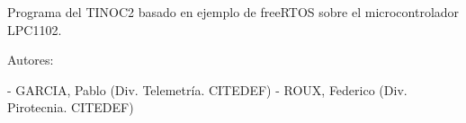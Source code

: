 Programa del T\+I\+N\+O\+C2 basado en ejemplo de free\+R\+T\+OS sobre el microcontrolador L\+P\+C1102.

Autores\+: \begin{DoxyVerb}- GARCIA, Pablo (Div. Telemetría. CITEDEF)
- ROUX, Federico (Div. Pirotecnia. CITEDEF)\end{DoxyVerb}
 